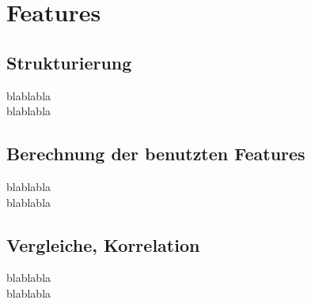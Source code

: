 
\chapter{Features} %
\label{cha:Features}

\section{Strukturierung} %
\label{sec:Strukturierung}
blablabla\\

blablabla


\section{Berechnung der benutzten Features} %
\label{sec:Berechnung_der_benutzten_Features}
blablabla\\

blablabla


\section{Vergleiche, Korrelation} %
\label{sec:Vergleiche_Korrelation}
blablabla\\

blablabla


